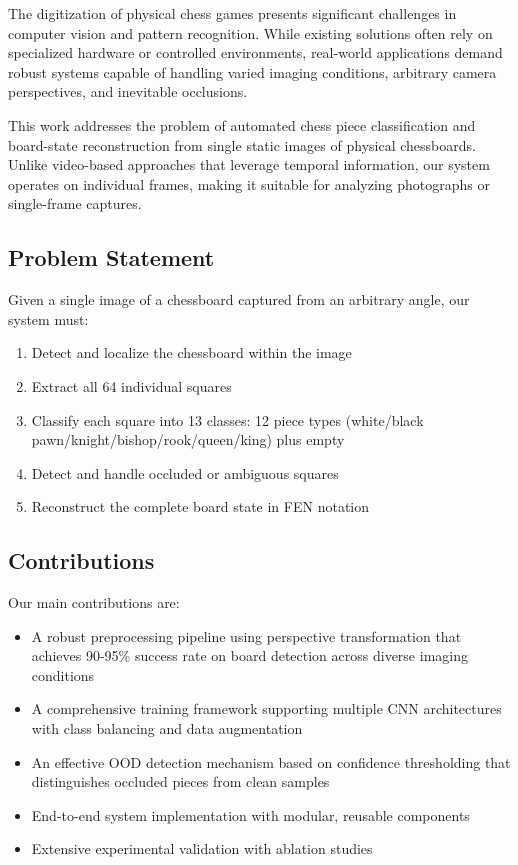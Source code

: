 \documentclass[conference]{IEEEtran}
\begin{document}
The digitization of physical chess games presents significant challenges in computer vision and pattern recognition. While existing solutions often rely on specialized hardware or controlled environments, real-world applications demand robust systems capable of handling varied imaging conditions, arbitrary camera perspectives, and inevitable occlusions.

This work addresses the problem of automated chess piece classification and board-state reconstruction from single static images of physical chessboards. Unlike video-based approaches that leverage temporal information, our system operates on individual frames, making it suitable for analyzing photographs or single-frame captures.

\subsection{Problem Statement}

Given a single image of a chessboard captured from an arbitrary angle, our system must:
\begin{enumerate}
    \item Detect and localize the chessboard within the image
    \item Extract all 64 individual squares
    \item Classify each square into 13 classes: 12 piece types (white/black pawn/knight/bishop/rook/queen/king) plus empty
    \item Detect and handle occluded or ambiguous squares
    \item Reconstruct the complete board state in FEN notation
\end{enumerate}

\subsection{Contributions}

Our main contributions are:
\begin{itemize}
    \item A robust preprocessing pipeline using perspective transformation that achieves 90-95\% success rate on board detection across diverse imaging conditions
    \item A comprehensive training framework supporting multiple CNN architectures with class balancing and data augmentation
    \item An effective OOD detection mechanism based on confidence thresholding that distinguishes occluded pieces from clean samples
    \item End-to-end system implementation with modular, reusable components
    \item Extensive experimental validation with ablation studies
\end{itemize}
\end{document}
